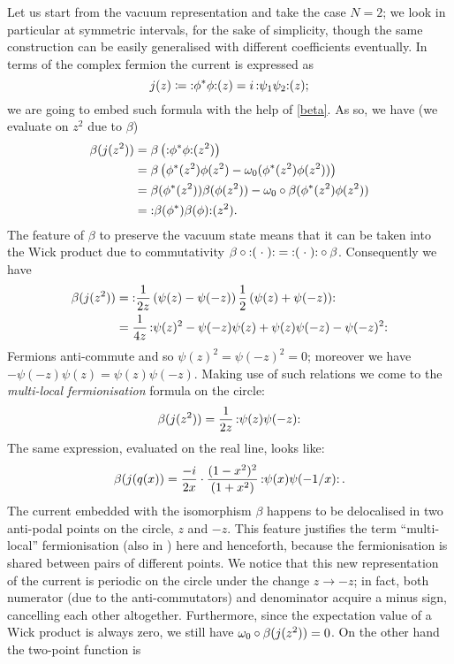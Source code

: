 \bigskip
Let us start from the vacuum representation and
take the case $N=2$; we look in particular at 
symmetric intervals, for the sake of simplicity, 
though the same construction can be easily generalised
with different coefficients eventually. In terms of the 
complex fermion the current is expressed as
\begin{equation}
\label{curr_complex}
j(z)\coloneqq \wick{\phi^*\phi}(z)=
i\,\wick{\psi_1\psi_2}(z);
\end{equation}
we are going to embed such formula with the help 
of \eqref{beta}. As so, we have (we evaluate on $z^2$
due to $\beta$) 
\begin{align*}
\beta(j(z^2))&=\beta\left(\wick{\phi^*\phi}(z^2)\right)\\
&=\beta\left(\phi^*(z^2)\phi(z^2)-\vac(\phi^*(z^2)\phi(z^2))\right)\\
&=\beta(\phi^*(z^2))\beta(\phi(z^2))-
  \vac\circ\beta(\phi^*(z^2)\phi(z^2))\\
&=\wick{\beta(\phi^*)\beta(\phi)}(z^2).
\end{align*}
The feature of $\beta$ to preserve the vacuum state means that 
it can be taken into the Wick product
due to commutativity $\beta\circ\wick{\blank}=\wick{\blank}
\circ\beta$. Consequently we have
\begin{align*}
\beta(j(z^2))&=\wick{\frac{1}{2z}
\left(\psi(z)-\psi(-z)\right)\frac{1}{2}
\left(\psi(z)+\psi(-z)\right)}\\
&=\frac{1}{4z}\,\wick{\psi(z)^2-
\psi(-z)\psi(z)+\psi(z)\psi(-z)-\psi(-z)^2}
\end{align*}
Fermions anti-commute and so $\psi(z)^2=\psi(-z)^2=0$;
moreover we have $-\psi(-z)\psi(z)=\psi(z)\psi(-z)$.
Making use of such relations we come to the 
\emph{multi-local fermionisation} formula on the 
circle:
\begin{equation}
\label{multi-local_fermionisation}
\beta(j(z^2))=\frac{1}{2z}\,\wick{\psi(z)\psi(-z)}
\end{equation}
The same expression, evaluated on the real line, looks like:
\[
\beta(j(q(x))= \frac{-i}{2x}\cdot\frac{(1-x^2)^2}{(1+x^2)}
\,\wick{\psi(x)\psi(-1/x)}\,.
\]
The current embedded with the isomorphism $\beta$
happens to be delocalised in two anti-podal points
on the circle, $z$ and $-z$. This feature justifies 
the term ``multi-local'' fermionisation (also in
\cite{Rehren:2012wa}) here and henceforth, because
the fermionisation is shared between pairs of 
different points. We notice that this new representation 
of the current is periodic on the circle 
under the change $z\to -z$;
in fact, both numerator (due to the anti-commutators)
and denominator acquire a minus sign, cancelling each
other altogether. Furthermore, since the expectation value 
of a Wick product is always zero, we still have 
$\omega_0\circ\beta (j(z^2))=0$. On the other hand the 
two-point function is 

